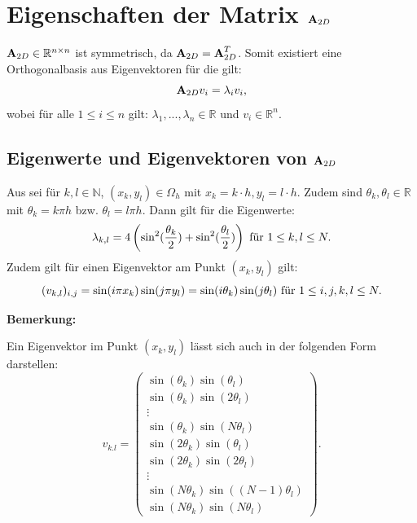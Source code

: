 \section{Eigenschaften der Matrix ${\textbf{A}}_{2D}$}\label{s.Eigenwerte und Eigenvektoren}

${\textbf{A}}_{2D} \in \mathbb{R}^{n \times n}$ ist symmetrisch, da ${\textbf{A}}_{2D} = {\textbf{A}}_{2D}^{T}$. Somit existiert eine Orthogonalbasis aus Eigenvektoren für die gilt:
\begin{equation}
{\textbf{A}}_{2D}v_{i} = \lambda_{i} v_{i},
\end{equation}
wobei für alle $1 \le i \le n$ gilt: $\lambda_{1},...,\lambda_{n} \in \mathbb{R}$ und $v_{i} \in \mathbb{R}^{n}$.

\subsection{Eigenwerte und Eigenvektoren von ${\textbf{A}}_{2D}$}\label{ss.Eigenwerte und Eigenvektoren}

Aus \cite[S. 411]{SAAD03} sei für $k,l \in \mathbb{N}$, $(x_{k},y_{l}) \in \Omega_{h}$ mit $x_{k} = k \cdot h, y_{l} = l \cdot h$. Zudem sind $\theta_{k}, \theta_{l} \in \mathbb{R}$ mit $\theta_{k} = k \pi h$ bzw. $\theta_{l} = l \pi h$. Dann gilt für die Eigenwerte:
\begin{equation}
\lambda_{k,l} = 4 \left(\sin^{2}(\frac {\theta_{k}} {2}) + \sin^{2}(\frac {\theta_{l}} {2}) \right) \textnormal{ für } 1 \le k,l \le N.\label{eq.Eigenwerte}
\end{equation}
Zudem gilt für einen Eigenvektor am Punkt $(x_{k},y_{l})$ gilt:
\begin{equation}
(v_{k,l})_{i,j} = \sin(i \pi x_{k}) \sin(j \pi y_{l}) = \sin(i\theta_{k}) \sin(j\theta_{l}) \textnormal{ für } 1 \le i,j,k,l \le N.
\end{equation}

\textbf{Bemerkung:}

Ein Eigenvektor im Punkt $(x_{k},y_{l})$ lässt sich auch in der folgenden Form darstellen:
\begin{equation}
v_{k.l} = 
\begin{pmatrix}
\sin(\theta_{k})\sin(\theta_{l})\\
\sin(\theta_{k})\sin(2 \theta_{l})\\
\vdots \\
\sin(\theta_{k})\sin(N \theta_{l})\\
\sin(2 \theta_{k})\sin(\theta_{l})\\
\sin(2 \theta_{k})\sin(2 \theta_{l})\\
\vdots\\
\sin(N \theta_{k})\sin((N-1) \theta_{l})\\
\sin(N \theta_{k})\sin(N \theta_{l})
\end{pmatrix}.
\end{equation}

